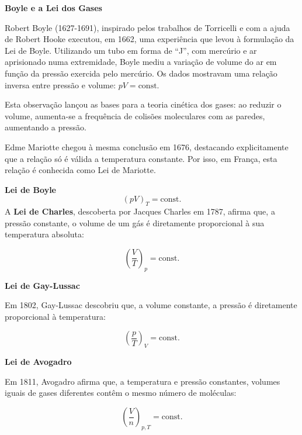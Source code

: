\begin{historybox}
    \textbf{Boyle e a Lei dos Gases}

    Robert Boyle (1627-1691), inspirado pelos trabalhos de Torricelli e com a ajuda de Robert Hooke executou, em 1662, uma experiência que levou à formulação da Lei de Boyle. Utilizando um tubo em forma de ``J'', com mercúrio e ar aprisionado numa extremidade, Boyle mediu a variação de volume do ar em função da pressão exercida pelo mercúrio. Os dados mostravam uma relação inversa entre pressão e volume: \( pV = \text{const} \).

    Esta observação lançou as bases para a teoria cinética dos gases: ao reduzir o volume, aumenta-se a frequência de colisões moleculares com as paredes, aumentando a pressão.

    Edme Mariotte chegou à mesma conclusão em 1676, destacando explicitamente que a relação só é válida a temperatura constante. Por isso, em França, esta relação é conhecida como Lei de Mariotte.

    \textbf{Lei de Boyle}
    \begin{equation*}
        \left( p V \right)_T = \text{const.}
    \end{equation*}
    A \textbf{Lei de Charles}, descoberta por Jacques Charles em 1787, afirma que, a pressão constante, o volume de um gás é diretamente proporcional à sua temperatura absoluta:

    \begin{equation*}
        \left( \frac{V}{T} \right)_p = \text{const.}
    \end{equation*}

    \textbf{Lei de Gay-Lussac}

    Em 1802, Gay-Lussac descobriu que, a volume constante, a pressão é diretamente proporcional à temperatura:

    \begin{equation*}
        \left( \frac{p}{T} \right)_V = \text{const.}
    \end{equation*}

    \textbf{Lei de Avogadro} 

    Em 1811, Avogadro afirma que, a temperatura e pressão constantes, volumes iguais de gases diferentes contêm o mesmo número de moléculas:

    \begin{equation*}
        \left( \frac{V}{n} \right)_{p, T} = \text{const.}
    \end{equation*}


\end{historybox}
